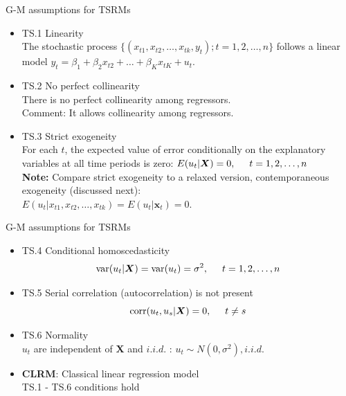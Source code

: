 \documentclass{beamer}
\begin{document}
\begin{frame}{G-M assumptions for TSRMs}
\begin{itemize}
\item TS.1 Linearity \\ 
The stochastic process $\{(x_{t1},x_{t2},\dots,x_{tk},y_t);t=1,2,\dots, n \}$ 
follows a linear model $ y_t = \beta_1 + \beta_2 x_{t2} + \dots + \beta_K x_{tK}+u_t$.
\medskip
\item TS.2 No perfect collinearity \\
There is no perfect collinearity among regressors. \\
{\footnotesize Comment: It allows collinearity among regressors.}
\medskip
\item TS.3 Strict exogeneity \\ 
For each $t$, the expected value of error conditionally on the explanatory variables at all time periods is zero: $ E(u_t|\boldsymbol{X})=0, \hspace{0.5cm} t = 1,2,\dots,n$ \\ \bigskip
    {\footnotesize \textbf{Note:} Compare strict exogeneity to a relaxed version, contemporaneous exogeneity (discussed next):\\ $E(u_t|x_{t1},x_{t2},\dots,x_{tk})=E(u_t|\boldsymbol{x}_t)=0$.}  
\end{itemize}
\end{frame}
\begin{frame}{G-M assumptions for TSRMs}
\begin{itemize}
 \item TS.4 Conditional homoscedasticity 
 $$\textnormal{var}(u_t|\boldsymbol{X})=\textnormal{var}(u_t)=\sigma^2, \hspace{0.5cm} t=1,2,\dots,n$$
 \medskip
 \item TS.5 Serial correlation (autocorrelation) is not present $$ \textnormal{corr}(u_t,u_s|\boldsymbol{X}) = 0, \hspace{0.5cm} t\neq s$$
 \medskip
 \item TS.6 Normality \\
 $u_t$ are independent of $\boldsymbol{X}$ and $\textit{i.i.d.}$ :  $u_t \sim N(0,\sigma^2), \textit{i.i.d.} $
  \vspace{0.6cm}
  \item \textbf{CLRM}: Classical linear regression model \\
 TS.1 - TS.6 conditions hold
\end{itemize}
\end{frame}
\end{document}
